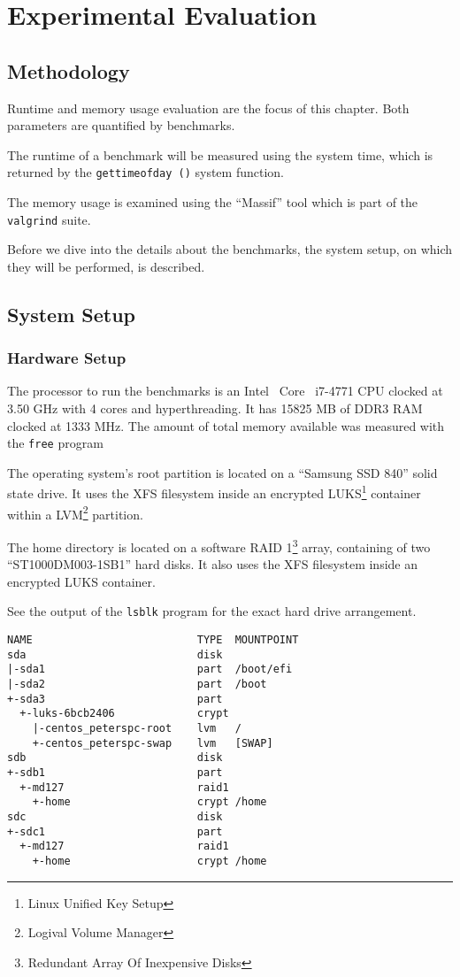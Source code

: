 \chapter{Experimental Evaluation}

\section{Methodology}

Runtime and memory usage evaluation are the focus of this chapter.
Both parameters are quantified by benchmarks.

The runtime of a benchmark will be measured using the system time, which is returned by the \texttt{gettimeofday ()} system function.

The memory usage is examined using the ``Massif'' tool which is part of the \texttt{valgrind} suite.\cite{valgrind}

Before we dive into the details about the benchmarks, the system setup, on which they will be performed, is described.

\section{System Setup}
  \subsection{Hardware Setup}

The processor to run the benchmarks is an Intel\textregistered~ Core\texttrademark~ i7-4771 CPU clocked at 3.50 GHz with 4 cores and hyperthreading.
It has 15825 MB of DDR3 RAM clocked at 1333 MHz.
The amount of total memory available was measured with the \texttt{free} program

The operating system's root partition is located on a ``Samsung SSD 840'' solid state drive.
It uses the XFS filesystem inside an encrypted LUKS\footnote{Linux Unified Key Setup} container within a LVM\footnote{Logival Volume Manager} partition.

The home directory is located on a software RAID 1\footnote{Redundant Array Of Inexpensive Disks} array, containing of two ``ST1000DM003-1SB1'' hard disks.
It also uses the XFS filesystem inside an encrypted LUKS container.

See the output of the \texttt{lsblk} program for the exact hard drive arrangement.

\begin{lstlisting}[caption={Disk arrangement on the benchmark machine}]
NAME                          TYPE  MOUNTPOINT
sda                           disk
|-sda1                        part  /boot/efi
|-sda2                        part  /boot
+-sda3                        part
  +-luks-6bcb2406             crypt
    |-centos_peterspc-root    lvm   /
    +-centos_peterspc-swap    lvm   [SWAP]
sdb                           disk
+-sdb1                        part
  +-md127                     raid1
    +-home                    crypt /home
sdc                           disk
+-sdc1                        part
  +-md127                     raid1
    +-home                    crypt /home
\end{lstlisting}

